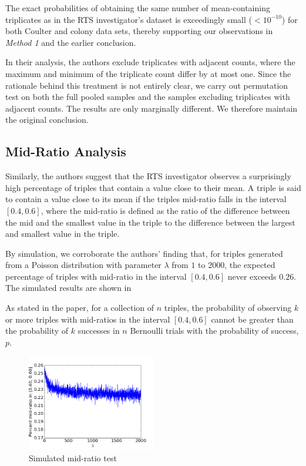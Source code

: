 \documentclass[11pt]{article}
\begin{document}
The exact probabilities of obtaining the same number of mean-containing triplicates as in the RTS investigator's dataset is exceedingly small ($< 10^{-10}$) for both Coulter and colony data sets, thereby supporting our observations in {\em Method 1} and the earlier conclusion.

In their analysis, the authors exclude triplicates with adjacent counts, where the maximum and minimum of the triplicate count differ by at most one. Since the rationale behind this treatment is not entirely clear, we carry out permutation test on both the full pooled samples and the samples excluding triplicates with adjacent counts. The results are only marginally different. We therefore maintain the original conclusion.

\subsection{Mid-Ratio Analysis}

Similarly, the authors suggest that the RTS investigator observes a surprisingly high percentage of triples that contain a value close to their mean. A triple is said to contain a value close to its mean if the triples mid-ratio falls in the interval $\left[0.4, 0.6\right]$, where the mid-ratio is defined as the ratio of the difference between the mid and the smallest value in the triple to the difference between the largest and smallest value in the triple.

By simulation, we corroborate the authors' finding that, for triples generated from a Poisson distribution with parameter $\lambda$ from $1$ to $2000$, the expected percentage of triples with mid-ratio in the interval $\left[0.4, 0.6\right]$ never exceeds $0.26$. The simulated results are shown in 

As stated in the paper, for a collection of $n$ triples, the probability of observing $k$ or more triples with mid-ratios in the interval $\left[0.4, 0.6\right]$ cannot be greater than the probability of $k$ successes in $n$ Bernoulli trials with the probability of success, $p$.

\begin{figure}[h]
    \centering
    \includegraphics[width=0.5\textwidth]{midratio_sim}
    \caption{Simulated mid-ratio test}
    \label{fig:midratio}
\end{figure}
 
\end{document}
